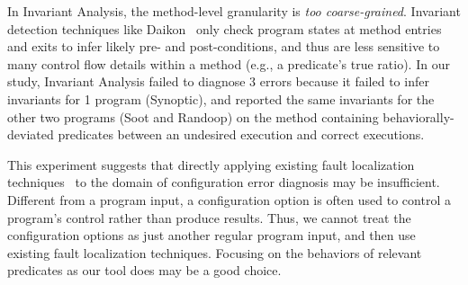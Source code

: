 In Invariant Analysis, the method-level granularity is \textit{too coarse-grained}.
Invariant detection techniques like Daikon~\cite{Ernst:1999}
only check program states at method entries and exits to infer
likely pre- and post-conditions, and thus are less
sensitive to many control flow details within a method (e.g., a predicate's
true ratio). In our study, Invariant Analysis failed to diagnose 3
errors because it failed to infer invariants for 1 program (Synoptic),
and reported the same invariants for the other two programs (Soot and Randoop)
on the method containing behaviorally-deviated predicates between an undesired execution and correct executions.





This experiment suggests that directly applying existing fault localization
techniques~\cite{Jones:2002, McCamant:2003} to the domain of
configuration error diagnosis may be insufficient. 
Different from a program input, a configuration option is
often used to control a program's control rather than
produce results. Thus, we cannot treat the configuration options
as just another regular program input, and then use existing
fault localization techniques.
Focusing on the behaviors of relevant predicates as our tool does
 may be a good choice.

